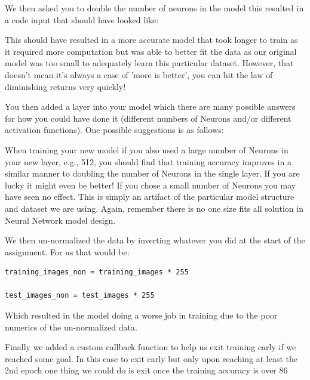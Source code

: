 We then asked you to double the number of neurons in the model this resulted in a code input that should have looked like:


This should have resulted in a more accurate model that took longer to train as it required more computation but was able to better fit the data as our original model was too small to adequately learn this particular dataset. However, that doesn't mean it's always a case of 'more is better', you can hit the law of diminishing returns very quickly!

You then added a layer into your model which there are many possible answers for how you could have done it (different numbers of Neurons and/or different activation functions). One possible suggestions is as follows:


When training your new model if you also used a large number of Neurons in your new layer, e.g., 512, you should find that training accuracy improves in a similar manner to doubling the number of Neurons in the single layer. If you are lucky it might even be better! If you chose a small number of Neurons you may have seen no effect. This is simply an artifact of the particular model structure and dataset we are using. Again, remember there is no one size fits all solution in Neural Network model design.

We then un-normalized the data by inverting whatever you did at the start of the assignment. For us that would be:

\begin{lstlisting}
training_images_non = training_images * 255

test_images_non = test_images * 255
\end{lstlisting}

Which resulted in the model doing a worse job in training due to the poor numerics of the un-normalized data.

Finally we added a custom callback function to help us exit training early if we reached some goal. In this case to exit early but only upon reaching at least the 2nd epoch one thing we could do is exit once the training accuracy is over 86%


